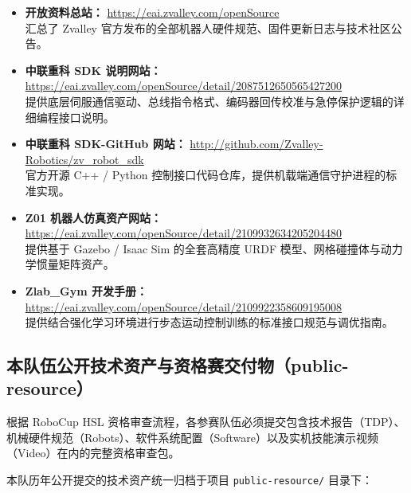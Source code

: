 \begin{itemize}[leftmargin=*]
    \item \textbf{开放资料总站：} \url{https://eai.zvalley.com/openSource} \\
    汇总了 Zvalley 官方发布的全部机器人硬件规范、固件更新日志与技术社区公告。
    \item \textbf{中联重科 SDK 说明网站：} \url{https://eai.zvalley.com/openSource/detail/2087512650565427200} \\
    提供底层伺服通信驱动、总线指令格式、编码器回传校准与急停保护逻辑的详细编程接口说明。
    \item \textbf{中联重科 SDK-GitHub 网站：} \url{http://github.com/Zvalley-Robotics/zv_robot_sdk} \\
    官方开源 C++ / Python 控制接口代码仓库，提供机载端通信守护进程的标准实现。
    \item \textbf{Z01 机器人仿真资产网站：} \url{https://eai.zvalley.com/openSource/detail/2109932634205204480} \\
    提供基于 Gazebo / Isaac Sim 的全套高精度 URDF 模型、网格碰撞体与动力学惯量矩阵资产。
    \item \textbf{Zlab\_Gym 开发手册：} \url{https://eai.zvalley.com/openSource/detail/2109922358609195008} \\
    提供结合强化学习环境进行步态运动控制训练的标准接口规范与调优指南。
\end{itemize}

\subsection{本队伍公开技术资产与资格赛交付物（public-resource）}

根据 RoboCup HSL 资格审查流程，各参赛队伍必须提交包含技术报告（TDP）、机械硬件规范（Robots）、软件系统配置（Software）以及实机技能演示视频（Video）在内的完整资格审查包。

本队历年公开提交的技术资产统一归档于项目 \texttt{public-resource/} 目录下：

